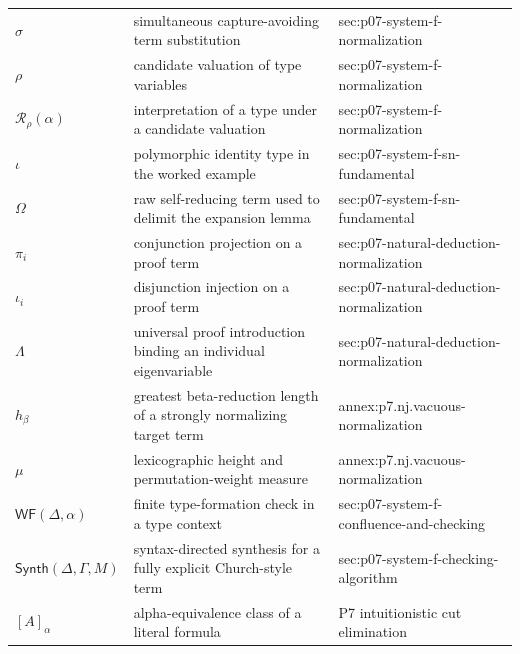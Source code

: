 \begin{longtable}{@{}p{}p{}p{}@{}}
\(\sigma\) & simultaneous capture-avoiding term substitution & sec:\allowbreak{}p07-\allowbreak{}system-\allowbreak{}f-\allowbreak{}normalization \\
\(\rho\) & candidate valuation of type variables & sec:\allowbreak{}p07-\allowbreak{}system-\allowbreak{}f-\allowbreak{}normalization \\
\(\mathcal R_\rho(\alpha)\) & interpretation of a type under a candidate valuation & sec:\allowbreak{}p07-\allowbreak{}system-\allowbreak{}f-\allowbreak{}normalization \\
\(\iota\) & polymorphic identity type in the worked example & sec:\allowbreak{}p07-\allowbreak{}system-\allowbreak{}f-\allowbreak{}sn-\allowbreak{}fundamental \\
\(\Omega\) & raw self-reducing term used to delimit the expansion lemma & sec:\allowbreak{}p07-\allowbreak{}system-\allowbreak{}f-\allowbreak{}sn-\allowbreak{}fundamental \\
\(\pi_i\) & conjunction projection on a proof term & sec:\allowbreak{}p07-\allowbreak{}natural-\allowbreak{}deduction-\allowbreak{}normalization \\
\(\iota_i\) & disjunction injection on a proof term & sec:\allowbreak{}p07-\allowbreak{}natural-\allowbreak{}deduction-\allowbreak{}normalization \\
\(\Lambda\) & universal proof introduction binding an individual eigenvariable & sec:\allowbreak{}p07-\allowbreak{}natural-\allowbreak{}deduction-\allowbreak{}normalization \\
\(h_\beta\) & greatest beta-reduction length of a strongly normalizing target term & annex:\allowbreak{}p7.\allowbreak{}nj.\allowbreak{}vacuous-\allowbreak{}normalization \\
\(\mu\) & lexicographic height and permutation-weight measure & annex:\allowbreak{}p7.\allowbreak{}nj.\allowbreak{}vacuous-\allowbreak{}normalization \\
\(\mathsf{WF}(\Delta,\allowbreak \alpha)\) & finite type-formation check in a type context & sec:\allowbreak{}p07-\allowbreak{}system-\allowbreak{}f-\allowbreak{}confluence-\allowbreak{}and-\allowbreak{}checking \\
\(\mathsf{Synth}(\Delta,\allowbreak \Gamma,\allowbreak M)\) & syntax-directed synthesis for a fully explicit Church-style term & sec:\allowbreak{}p07-\allowbreak{}system-\allowbreak{}f-\allowbreak{}checking-\allowbreak{}algorithm \\
\([A]_\alpha\) & alpha-equivalence class of a literal formula & P7 intuitionistic cut elimination \\

\end{longtable}
